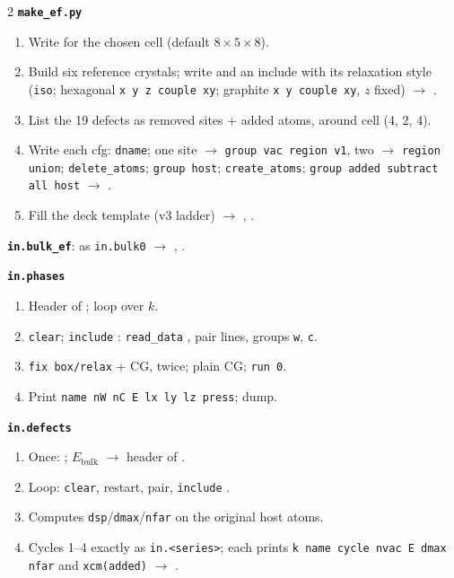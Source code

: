 \documentclass[10pt]{article}
\newcommand{\cmd}[1]{\texttt{\small #1}}
\begin{document}
\begin{multicols}{2}
\small
\textbf{\cmd{make\_ef.py}}
\begin{enumerate}
\item Write  for the chosen cell (default $8\times5\times8$).
\item Build six reference crystals; write  and an include  with its relaxation style (\cmd{iso}; hexagonal \cmd{x y z couple xy}; graphite \cmd{x y couple xy}, $z$ fixed) $\rightarrow$ .
\item List the 19 defects as removed sites + added atoms, around cell (4, 2, 4).
\item Write each cfg: \cmd{dname}; one site $\rightarrow$ \cmd{group vac region v1}, two $\rightarrow$ \cmd{region union}; \cmd{delete\_atoms}; \cmd{group host}; \cmd{create\_atoms}; \cmd{group added subtract all host} $\rightarrow$ .
\item Fill the deck template (v3 ladder) $\rightarrow$ , .
\end{enumerate}

\textbf{\cmd{in.bulk\_ef}}: as \cmd{in.bulk0} $\rightarrow$ , .

\textbf{\cmd{in.phases}}
\begin{enumerate}
\item Header of ; loop over $k$.
\item \cmd{clear}; \cmd{include} : \cmd{read\_data} , pair lines, groups \cmd{w}, \cmd{c}.
\item \cmd{fix box/relax} + CG, twice; plain CG; \cmd{run 0}.
\item Print \cmd{name nW nC E lx ly lz press}; dump.
\end{enumerate}

\textbf{\cmd{in.defects}}
\begin{enumerate}
\item Once: ; $E_\mathrm{bulk}$ $\rightarrow$ header of .
\item Loop: \cmd{clear}, restart, pair, \cmd{include} .
\item Computes \cmd{dsp}/\cmd{dmax}/\cmd{nfar} on the original host atoms.
\item Cycles 1--4 exactly as \cmd{in.<series>}; each prints \cmd{k name cycle nvac E dmax nfar} and \cmd{xcm(added)} $\rightarrow$ .
\end{enumerate}


\end{multicols}
\end{document}
